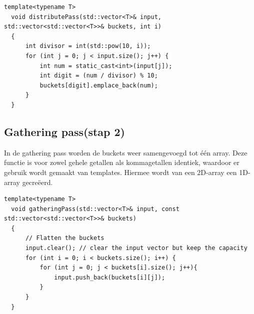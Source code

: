 \documentclass{article}
\begin{document}
\begin{lstlisting}[caption={Distribution pass}, label={lst:distribution}]
  template<typename T>
  void distributePass(std::vector<T>& input, std::vector<std::vector<T>>& buckets, int i)
  {   
      int divisor = int(std::pow(10, i));
      for (int j = 0; j < input.size(); j++) {
          int num = static_cast<int>(input[j]);
          int digit = (num / divisor) % 10;
          buckets[digit].emplace_back(num);
      }
  }
\end{lstlisting}
\subsection{Gathering pass(stap 2)}
In de gathering pass worden de buckets weer samengevoegd tot één array. Deze functie is voor zowel gehele getallen als kommagetallen identiek, 
waardoor er gebruik wordt gemaakt van templates. Hiermee wordt van een 2D-array een 1D-array gecreëerd.

\newpage
\begin{lstlisting}[caption={Gathering pass}, label={lst:gathering}]
  template<typename T>
  void gatheringPass(std::vector<T>& input, const std::vector<std::vector<T>>& buckets)
  {       
      // Flatten the buckets
      input.clear(); // clear the input vector but keep the capacity
      for (int i = 0; i < buckets.size(); i++) {
          for (int j = 0; j < buckets[i].size(); j++){
              input.push_back(buckets[i][j]);
          }
      }
  }
\end{lstlisting}
\end{document}
